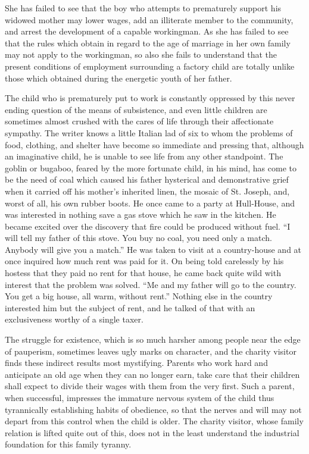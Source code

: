 \documentclass[]{article}
\begin{document}
\begin{sectionbody}
\addamsparagraph She has failed to see that the boy who attempts to prematurely support
his widowed mother may lower wages, add an illiterate member to the
community, and arrest the development of a capable workingman. As she
has failed to see that the rules which obtain in regard to the age of
marriage in her own family may not apply to the workingman, so also she
fails to understand that the present conditions of employment
surrounding a factory child are totally unlike those which obtained
during the energetic youth of her father.

\addamsparagraph The child who is prematurely put to work is constantly oppressed by this
never ending question of the means of subsistence, and even little
children are sometimes almost crushed with the cares of life through
their affectionate sympathy. The writer knows a little Italian lad of
six to whom the problems of food, clothing, and shelter have become so
immediate and pressing that, although an imaginative child, he is unable
to see life from any other standpoint. The goblin or bugaboo, feared by
the more fortunate child, in his mind, has come to be the need of coal
which caused his father hysterical and demonstrative grief when it
carried off his mother's inherited linen, the mosaic of St. Joseph, and,
worst of all, his own rubber boots. He once came to a party at
Hull-House, and was interested in nothing save a gas stove which he saw
in the kitchen. He became excited over the discovery that fire could be
produced without fuel. ``I will tell my father of this stove. You buy no
coal, you need only a match. Anybody will give you a match.'' He was
taken to visit at a country-house and at once inquired how much rent was
paid for it. On being told carelessly by his hostess that they paid no
rent for that house, he came back quite wild with interest that the
problem was solved. ``Me and my father will go to the country. You get a
big house, all warm, without rent.'' Nothing else in the country
interested him but the subject of rent, and he talked of that with an
exclusiveness worthy of a single taxer.

\addamsparagraph The struggle for existence, which is so much harsher among people near
the edge of pauperism, sometimes leaves ugly marks on character, and the
charity visitor finds these indirect results most mystifying. Parents
who work hard and anticipate an old age when they can no longer earn,
take care that their children shall expect to divide their wages with
them from the very first. Such a parent, when successful, impresses the
immature nervous system of the child thus tyrannically establishing
habits of obedience, so that the nerves and will may not depart from
this control when the child is older. The charity visitor, whose family
relation is lifted quite out of this, does not in the least understand
the industrial foundation for this family tyranny.


\end{sectionbody}
\end{document}
